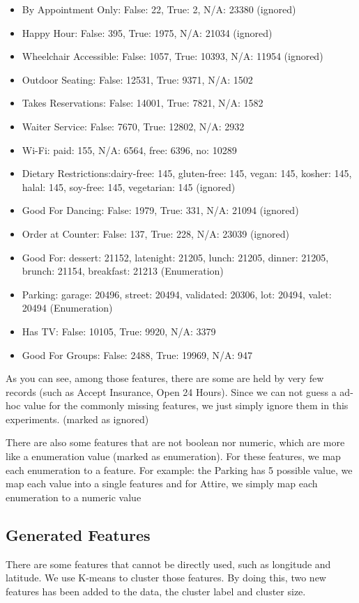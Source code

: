 \documentclass{article}
\begin{document}
\begin{itemize}
\item By Appointment Only: False: 22, True: 2, N/A: 23380 (ignored)
\item Happy Hour: False: 395, True: 1975, N/A: 21034 (ignored)
\item Wheelchair Accessible: False: 1057, True: 10393, N/A: 11954 (ignored)
\item Outdoor Seating: False: 12531, True: 9371, N/A: 1502
\item Takes Reservations: False: 14001, True: 7821, N/A: 1582
\item Waiter Service: False: 7670, True: 12802, N/A: 2932
\item Wi-Fi: paid: 155, N/A: 6564, free: 6396, no: 10289
\item Dietary Restrictions:dairy-free: 145, gluten-free: 145, vegan: 145, kosher: 145, halal: 145, soy-free: 145, vegetarian: 145 (ignored)
\item Good For Dancing: False: 1979, True: 331, N/A: 21094 (ignored)
\item Order at Counter: False: 137, True: 228, N/A: 23039 (ignored)
\item Good For: dessert: 21152, latenight: 21205, lunch: 21205, dinner: 21205, brunch: 21154, breakfast: 21213 (Enumeration)
\item Parking: garage: 20496, street: 20494, validated: 20306, lot: 20494, valet: 20494 (Enumeration)
\item Has TV: False: 10105, True: 9920, N/A: 3379
\item Good For Groups: False: 2488, True: 19969, N/A: 947
\end{itemize}

As you can see, among those features, there are some are held by very few records (such as Accept Insurance, Open 24 Hours). Since we can not guess a ad-hoc value for the commonly missing features, we just simply ignore them in this experiments. (marked as ignored)

There are also some features that are not boolean nor numeric, which are more like a enumeration value (marked as enumeration). For these features, we map each enumeration to a feature.
For example: the Parking has 5 possible value, we map each value into a single features
and for Attire, we simply map each enumeration to a numeric value

\subsection{Generated Features}
There are some features that cannot be directly used, such as longitude and latitude. We use K-means to cluster those features. By doing this, two new features has been added to the data, the cluster label and cluster size.
\end{document}
